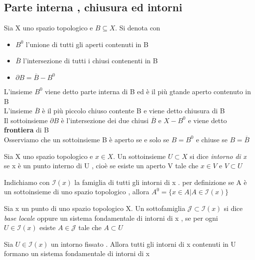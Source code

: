 		\subsection{Parte interna , chiusura ed intorni }
		\begin{definizione}
			Sia X uno spazio topologico e $B \subseteq X $. Si denota con 
			\begin{itemize}
\item $B^0$ l'unione di tutti gli aperti contenuti in B 
\item $\overline{B}$ l'intersezione di tutti i chiusi contenenti in B 
\item $\partial B = \overline{B} - B^0$
			\end{itemize}
			L'insieme $B^0$ viene detto parte interna di B ed è il più gtande aperto contenuto in B \\
			L'insieme $\overline{B}$ è il più piccolo chiuso contente B e viene detto chiusura di B \\
			Il sottoinsieme $\partial B $ è l'intersezione dei due chiusi $\overline{B}$ e $X - B^0$ e viene detto \textbf{frontiera} di B \\
		Osserviamo che un sottoinsieme B è aperto se e solo se $B=B^0$ e chiuse se $B= \overline{B}$
		\end{definizione}
		
\begin{definizione}
	Sia X uno spazio topologico e $x \in X$. Un sottoinsieme $U \subset X$ si dice \textit{intorno di x} se x è un punto interno di U , cioè se esiste un aperto V tale che $x\in V$ e $V \subset U $
\end{definizione}
Indichiamo con $\mathcal{I}(x) $ la famiglia di tutti gli intorni di x . per definizione se  A è un sottoinsieme di uno spazio topologico , allora $A^0 = \{ x \in A | A \in \mathcal{I}(x)\} $
\begin{definizione}
	Sia x un punto di uno spazio topologico X. Un sottofamiglia $ \mathcal{J}\subset \mathcal{I}(x)$ si dice \textit{base locale} oppure un sistema fondamentale di intorni di x , se per ogni $U \in \mathcal{I}(x)$ esiste $A \in \mathcal{J} $ tale che $A \subset U $
\end{definizione}
\begin{es}
	Sia $U \in \mathcal{I}(x)$ un intorno fissato . Allora tutti gli intorni di x contenuti in U formano un sistema fondamentale di intorni di x 
\end{es}
